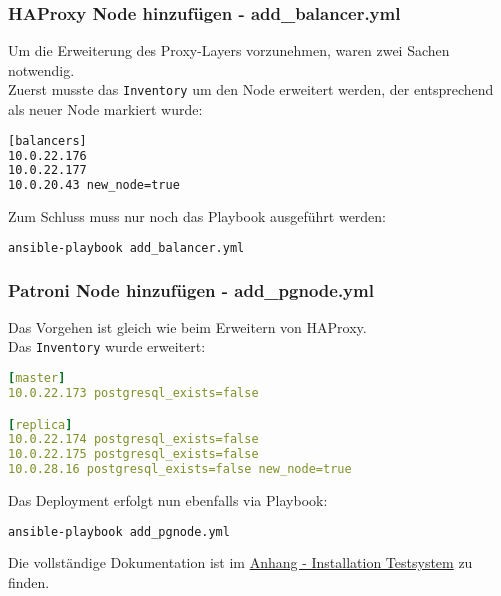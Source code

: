 \begin{flushleft}
    \subsubsection{\Gls{HAProxy} Node hinzufügen - add\_balancer.yml}
    Um die Erweiterung des Proxy-Layers vorzunehmen, waren zwei Sachen notwendig.\\
    Zuerst musste das \texttt{Inventory} um den Node erweitert werden, der entsprechend als neuer Node markiert wurde:
    \lstset{style=gra_codestyle}
    \begin{lstlisting}[language=bash, caption=HAProxy Node erweitern - Inventory,captionpos=b,label={lst:add-balancer-inventory},breaklines=true]
[balancers]
10.0.22.176
10.0.22.177
10.0.20.43 new_node=true
    \end{lstlisting}
    Zum Schluss muss nur noch das Playbook ausgeführt werden:
    \lstset{style=gra_codestyle}
    \begin{lstlisting}[language=bash, caption=HAProxy Node erweitern - add\_balancer.yml,captionpos=b,label={lst:add-balancer},breaklines=true]
ansible-playbook add_balancer.yml
    \end{lstlisting}
    \subsubsection{Patroni Node hinzufügen - add\_pgnode.yml}
    Das Vorgehen ist gleich wie beim Erweitern von \Gls{HAProxy}.\\
    Das \texttt{Inventory} wurde erweitert:
    \lstset{style=gra_codestyle}
    \begin{lstlisting}[language=yaml, caption=Patroni Node erweitern - Inventory,captionpos=b,label={lst:add-pgnode-inventory},breaklines=true]
[master]
10.0.22.173 postgresql_exists=false

[replica]
10.0.22.174 postgresql_exists=false
10.0.22.175 postgresql_exists=false
10.0.28.16 postgresql_exists=false new_node=true
    \end{lstlisting}
    Das Deployment erfolgt nun ebenfalls via Playbook:
    \lstset{style=gra_codestyle}
    \begin{lstlisting}[language=bash, caption=Patroni Node erweitern - add\_pgnode.yml,captionpos=b,label={lst:add-pgnode},breaklines=true]
ansible-playbook add_pgnode.yml
    \end{lstlisting}
\end{flushleft}
\begin{flushleft}
    Die vollständige Dokumentation ist im \hyperref[sec:construction_implementation_installation]{Anhang - Installation Testsystem} zu finden.
\end{flushleft}